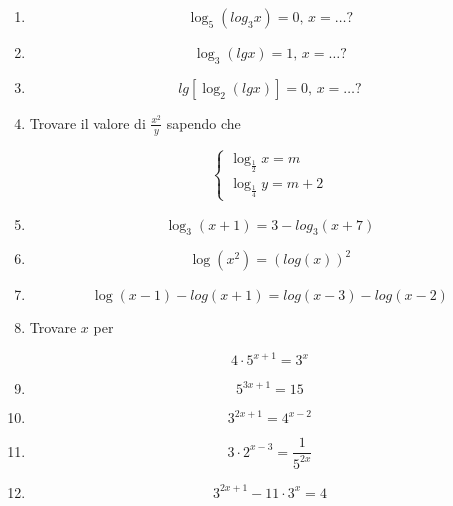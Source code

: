 \begin{enumerate}
\item
\[
\log_5(log_3x)=0\textrm{, }x=\ldots?
\]

\item
\[
\log_3(lg x)=1\textrm{, }x=\ldots?
\]

\item
\[
lg[\log_2(lg x)]=0\textrm{, }x=\ldots?
\]

\item

Trovare il valore di $\frac{x^2}{y}$ sapendo che 

\[
\left\{
\begin{array}{ll}
\log_\frac{1}{2} x=m\\
\log_{\frac{1}{4}}y=m+2
\end{array}
\right.
\]


\item

\[
\log_3(x+1)=3-log_3(x+7)
\]


\item

\[
\log(x^2)=(log(x))^2 
\]



\item
\[
\log(x-1)-log(x+1)=log(x-3)-log(x-2)
\]



\item Trovare $x$ per 

\[
4\cdot 5^{x+1} = 3^x
\]


\item 
\[
5^{3x+1}=15
\]

\item 
\[
3^{2x+1}=4^{x-2}
\]

\item 
\[
3\cdot 2^{x-3}=\frac{1}{5^{2x}}
\]


\item 
\[
3^{2x+1}-11\cdot 3^x=4
\]



\end{enumerate}
